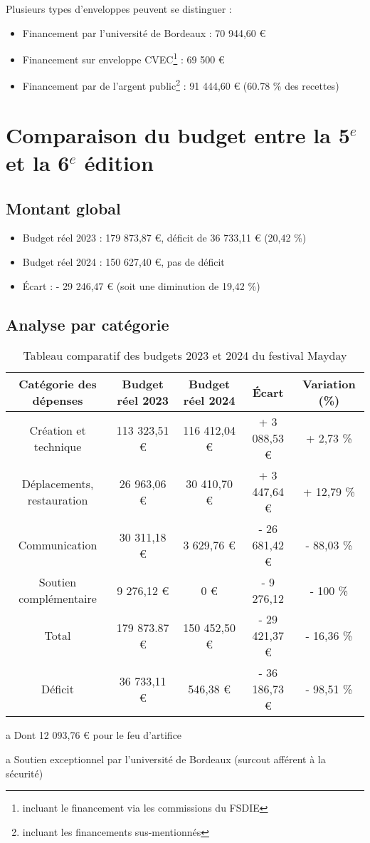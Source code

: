 \documentclass[12pt,a4paper]{report}
\begin{document}
Plusieurs types d'enveloppes peuvent se distinguer : 
\begin{itemize}
\item Financement par l'université de Bordeaux : 70 944,60 € 
\item Financement sur enveloppe CVEC\footnote{incluant le financement via les commissions du FSDIE} : 69 500 €
\item Financement par de l'argent public\footnote{incluant les financements sus-mentionnés} : 91 444,60 € (60.78 \% des recettes)
\end{itemize}

\section{Comparaison du budget entre la 5$^e$ et la 6$^e$ édition}
\subsection{Montant global}
\begin{itemize}
\item Budget réel 2023 : 179 873,87 €, déficit de 36 733,11 € (20,42 \%)
\item Budget réel 2024 : 150 627,40 €, pas de déficit
\item Écart : - 29 246,47 € (soit une diminution de 19,42 \%)
\end{itemize}

\subsection{Analyse par catégorie}
\begin{table}[h!]
\centering
\begin{threeparttable}
\begin{tabular}{|c|c|c|c|c|}
\hline
Catégorie des dépenses & Budget réel 2023 & Budget réel 2024 & Écart & Variation (\%) \\
\hline
Création et technique & 113 323,51 € & 116 412,04 € & + 3 088,53 € & + 2,73 \% \\
Déplacements, restauration & 26 963,06 € & 30 410,70 € & + 3 447,64 € & + 12,79 \% \\
Communication & 30 311,18 €\tnote{a} & 3 629,76 € & - 26 681,42 € & - 88,03 \% \\
Soutien complémentaire\tnote{b} & 9 276,12 € & 0 € & - 9 276,12 & - 100 \%\\
\hline
Total & 179 873.87 € & 150 452,50 € & - 29 421,37 € & - 16,36 \%\\
\hline
\hline
Déficit & 36 733,11 € & 546,38 € & - 36 186,73 € & - 98,51 \%\\
\hline
\end{tabular}
\caption{Tableau comparatif des budgets 2023 et 2024 du festival Mayday}
\begin{tablenotes}
   \item[a] Dont 12 093,76 € pour le feu d'artifice
   \item[a] Soutien exceptionnel par l'université de Bordeaux (surcout afférent à la sécurité)
\end{tablenotes}
\end{threeparttable}
\end{table}
\end{document}
